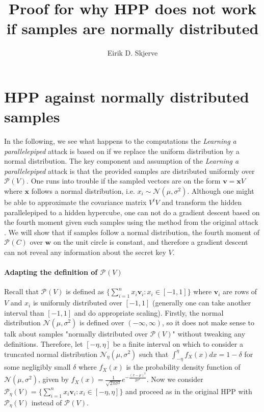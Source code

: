 \documentclass[12 pt]{article}        	%
\newcommand{\PP}[2][]{\mathcal{P}_{#1}(\mat{#2})}
\newcommand{\mat}[1]{\mathit{#1}}
\renewcommand{\vec}[1]{\mathbf{#1}}
\newcommand{\normdist}[2]{\mathcal{N}(#1, #2^2)}
\begin{document}
\title{Proof for why HPP does not work if samples are normally distributed}
\author{Eirik D. Skjerve}
\maketitle

\section{HPP against normally distributed samples}
In the following, we see what happens to the computations the \textit{Learning a parallelepiped} attack is based on if we replace the uniform distribution by a normal distribution.
The key component and assumption of the \textit{Learning a parallelepiped} attack is that the provided samples are distributed uniformly over $\PP{V}$.
One runs into trouble if the sampled vectors are on the form $\vec{v} = \vec{x} \mat{V}$ where $\vec{x}$ follows a normal distribution, i.e. $x_i \sim \normdist{\mu}{\sigma}$.
Although one might be able to approximate the covariance matrix $\mat{V}^t \mat{V}$ and transform the hidden parallelepiped to a hidden hypercube, 
one can not do a gradient descent based on the fourth moment given such samples using the method from the original attack \cite{NR09}. We will show that if samples follow a normal distribution, 
the fourth moment of $\PP{C}$ over $\vec{w}$ on the unit circle is constant, and therefore a gradient descent can not reveal any information about the secret key $\mat{V}$.

\paragraph{Adapting the definition of $\PP{V}$}
Recall that $\PP{V}$ is defined as $\{\sum_{i=1}^n x_i \vec{v}_i : x_i \in [-1, 1]\}$ where $\vec{v}_i$ are rows of $\mat{V}$ and $x_i$ is uniformly distributed over $[-1, 1]$ 
(generally one can take another interval than $[-1, 1]$ and do appropriate scaling).
Firstly, the normal distribution $\normdist{\mu}{\sigma}$ is defined over $(- \infty, \infty)$, so it does not make sense to talk about samples "normally distributed over $\PP{V}$" without tweaking any definitions.
Therefore, let $[- \eta, \eta]$ be a finite interval on which to consider a truncated normal distribution $\mathcal{N}_{\eta}(\mu, \sigma^2)$ such that $\int_{-\eta}^{\eta} f_X(x) dx = 1 - \delta$ for some negligibly small $\delta$
where $f_X(x)$ is the probability density function of $\normdist{\mu}{\sigma}$, given by $f_X(x) = \frac{1}{\sqrt{2 \pi \sigma^2}} e^{-\frac{(x- \mu)^2}{2 \sigma^2}}$.
Now we consider $\PP[\eta]{V} = \{\sum_{i=1}^n x_i \vec{v}_i : x_i \in [-\eta, \eta]\}$ and proceed as in the original HPP with $\PP[\eta]{V}$ instead of $\PP{V}$.
\end{document}
